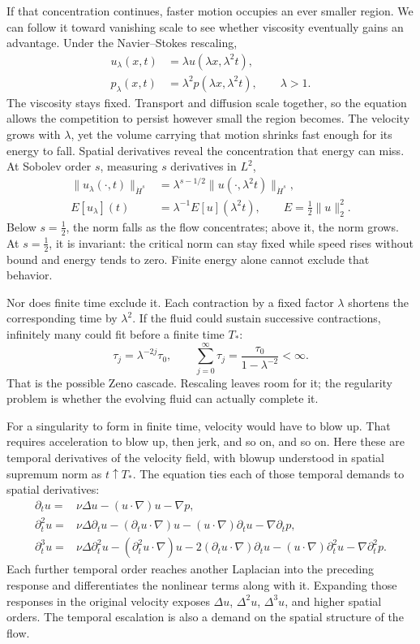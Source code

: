If that concentration continues, faster motion occupies an ever smaller
region. We can follow it toward vanishing scale to see whether viscosity
eventually gains an advantage. Under the Navier--Stokes rescaling,
\[
 \begin{aligned}
 u_\lambda(x,t)&=\lambda u(\lambda x,\lambda^2t),\\
 p_\lambda(x,t)&=\lambda^2p(\lambda x,\lambda^2t),
 \qquad \lambda>1.
 \end{aligned}
\]
The viscosity stays fixed. Transport and diffusion scale together, so the
equation allows the competition to persist however small the region becomes.
The velocity grows with \(\lambda\), yet the volume carrying that motion
shrinks fast enough for its energy to fall. Spatial derivatives reveal the
concentration that energy can miss. At Sobolev order \(s\), measuring \(s\)
derivatives in \(L^2\),
\[
 \begin{aligned}
 \|u_\lambda(\cdot,t)\|_{\dot H^s}
 &=\lambda^{s-1/2}\|u(\cdot,\lambda^2t)\|_{\dot H^s},\\
 E[u_\lambda](t)&=\lambda^{-1}E[u](\lambda^2t),
 \qquad E=\tfrac12\|u\|_2^2.
 \end{aligned}
\]
Below \(s=\tfrac12\), the norm falls as the flow concentrates; above it,
the norm grows. At \(s=\tfrac12\), it is invariant: the critical norm can
stay fixed while speed rises without bound and energy tends to zero.
Finite energy alone cannot exclude that behavior.

Nor does finite time exclude it. Each contraction by a fixed factor
\(\lambda\) shortens the corresponding time by \(\lambda^2\). If the
fluid could sustain successive contractions, infinitely many could fit
before a finite time \(T_*\):
\[
 \tau_j=\lambda^{-2j}\tau_0,
 \qquad
 \sum_{j=0}^{\infty}\tau_j
 =\frac{\tau_0}{1-\lambda^{-2}}<\infty.
\]
That is the possible Zeno cascade. Rescaling leaves room for it; the
regularity problem is whether the evolving fluid can actually complete it.

For a singularity to form in finite time, velocity would have to blow up.
That requires acceleration to blow up, then jerk, and so on, and so on.
Here these are temporal derivatives of the velocity field, with blowup
understood in spatial supremum norm as \(t\uparrow T_*\). The equation
ties each of those temporal demands to spatial derivatives:
\[
 \begin{aligned}
 \partial_tu={}&\nu\Delta u-(u\cdot\nabla)u-\nabla p,\\
 \partial_t^2u={}&\nu\Delta\partial_tu
 -(\partial_tu\cdot\nabla)u
 -(u\cdot\nabla)\partial_tu-\nabla\partial_tp,\\
 \partial_t^3u={}&\nu\Delta\partial_t^2u
 -(\partial_t^2u\cdot\nabla)u
 -2(\partial_tu\cdot\nabla)\partial_tu
 -(u\cdot\nabla)\partial_t^2u
 -\nabla\partial_t^2p.
 \end{aligned}
\]
Each further temporal order reaches another Laplacian into the preceding
response and differentiates the nonlinear terms along with it. Expanding
those responses in the original velocity exposes \(\Delta u\),
\(\Delta^2u\), \(\Delta^3u\), and higher spatial orders. The temporal
escalation is also a demand on the spatial structure of the flow.

